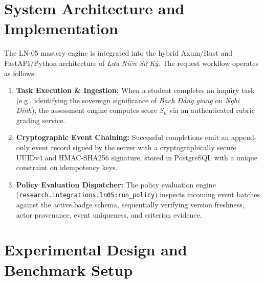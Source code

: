 \documentclass[11pt,a4paper]{article}
\begin{document}
\section{System Architecture and Implementation}

The LN-05 mastery engine is integrated into the hybrid Axum/Rust and FastAPI/Python architecture of \textit{Lưu Niên Sứ Ký}. The request workflow operates as follows:
\begin{enumerate}
    \item \textbf{Task Execution \& Ingestion:} When a student completes an inquiry task (e.g., identifying the sovereign significance of \textit{Bạch Đằng giang} on \textit{Nghị Đỉnh}), the assessment engine computes score $S_k$ via an authenticated rubric grading service.
    \item \textbf{Cryptographic Event Chaining:} Successful completions emit an append-only event record signed by the server with a cryptographically secure UUIDv4 and HMAC-SHA256 signature, stored in PostgreSQL with a unique constraint on idempotency keys.
    \item \textbf{Policy Evaluation Dispatcher:} The policy evaluation engine (\texttt{research.integrations.ln05:run\_policy}) inspects incoming event batches against the active badge schema, sequentially verifying version freshness, actor provenance, event uniqueness, and criterion evidence.
\end{enumerate}

\section{Experimental Design and Benchmark Setup}
\end{document}
